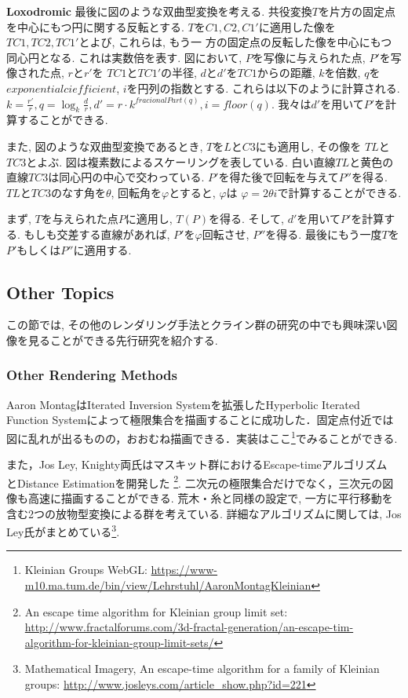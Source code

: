 \noindent\textbf{Loxodromic}
最後に図のような双曲型変換を考える.
共役変換$T$を片方の固定点を中心にもつ円に関する反転とする.
$T$を$C1, C2, C1'$に適用した像を$TC1, TC2, TC1'$とよび, これらは, もう一
方の固定点の反転した像を中心にもつ同心円となる.
これは実数倍を表す.
図において, $P$を写像に与えられた点, $P'$を写像された点, $r$と$r'$を
$TC1$と$TC1'$の半径, $d$と$d'$を$TC1$からの距離, $k$を倍数, $q$を
$exponential ciefficient$,  $i$を円列の指数とする.
これらは以下のように計算される.
 \begin{math}
  k = \frac{r'}{r},
  q = \log_{k} \frac{d}{r},
  d' = r \cdot k^{fracionalPart(q)},
  i = floor(q).
 \end{math}
我々は$d'$を用いて$P'$を計算することができる.

また, 図のような双曲型変換であるとき, $T$を$L$と$C3$にも適用し, その像を
$TL$と$TC3$とよぶ.
図は複素数によるスケーリングを表している.
白い直線$TL$と黄色の直線$TC3$は同心円の中心で交わっている.
$P'$を得た後で回転を与えて$P''$を得る.
$TL$と$TC3$のなす角を$\theta$, 回転角を$\varphi$とすると, $\varphi$は
$\varphi = 2 \theta i$で計算することができる.

まず, $T$を与えられた点$P$に適用し, $T(P)$を得る.
そして, $d'$を用いて$P'$を計算する.
もしも交差する直線があれば, $P'$を$\varphi$回転させ, $P''$を得る.
最後にもう一度$T$を$P'$もしくは$P''$に適用する.

\subsection{Other Topics}

この節では, その他のレンダリング手法とクライン群の研究の中でも興味深い図像を見ることができる先行研究を紹介する.

\subsubsection{Other Rendering Methods}
Aaron MontagはIterated Inversion Systemを拡張したHyperbolic Iterated Function Systemによって極限集合を描画することに成功した\cite{hyperbolicIFS}．固定点付近では図に乱れが出るものの，おおむね描画できる．実装はここ\footnote{Kleinian Groups WebGL: \url{https://www-m10.ma.tum.de/bin/view/Lehrstuhl/AaronMontagKleinian}}でみることができる.

また，Jos Ley, Knighty両氏はマスキット群におけるEscape-timeアルゴリズム
とDistance Estimationを開発した
\footnote{An escape time algorithm for Kleinian group limit set:\\ \quad
\quad \url{http://www.fractalforums.com/3d-fractal-generation/an-escape-tim-algorithm-for-kleinian-group-limit-sets/}}.
 二次元の極限集合だけでなく，三次元の図像も高速に描画することができる.
荒木・糸\cite{maskit}と同様の設定で, 一方に平行移動を含む2つの放物型変換による群を考えている.
詳細なアルゴリズムに関しては, Jos Ley氏がまとめている\footnote{Mathematical Imagery, An escape-time algorithm for a family of Kleinian groups: \url{http://www.josleys.com/article_show.php?id=221}}.

